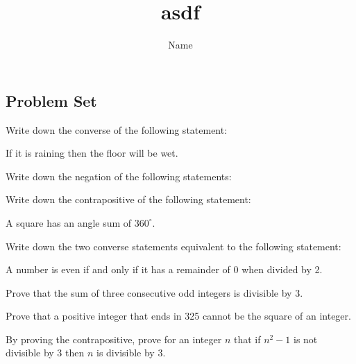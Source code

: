 \documentclass[11pt, a4paper, oneside]{exam}
\title{asdf}
\author{Name
}
\date{}
\theoremstyle{definition}\newtheorem{define}{Definition}[section]
\theoremstyle{remark}\newtheorem{remark}{Remark}
\theoremstyle{definition}\newtheorem{example}{Example}[subsection]
\theoremstyle{definition}\newtheorem{notation}{Notation}[section]
\theoremstyle{definition}\newtheorem{theorem}{Theorem}[section]
\theoremstyle{definition}\newtheorem{corollary}{Corollary}[section]
\begin{document}
\begin{questions}
\section{Problem Set}

\question[1]
Write down the converse of the following statement:

If it is raining then the floor will be wet.

\question
Write down the negation of the following statements:

\question[1] 
Write down the contrapositive of the following statement:

A square has an angle sum of $360^\circ$.

\question[1]
Write down the two converse statements equivalent to the following statement:

A number is even if and only if it has a remainder of 0 when divided by 2.

\question[2] Prove that the sum of three consecutive odd integers is divisible by 3.

\question[2] Prove that a positive integer that ends in 325 cannot be the square of an integer.

\question[2] By proving the contrapositive, prove for an integer $n$ that if $n^2-1$ is not divisible by 3 then $n$ is divisible by 3.

\question
{}
\end{questions}
\end{document}

